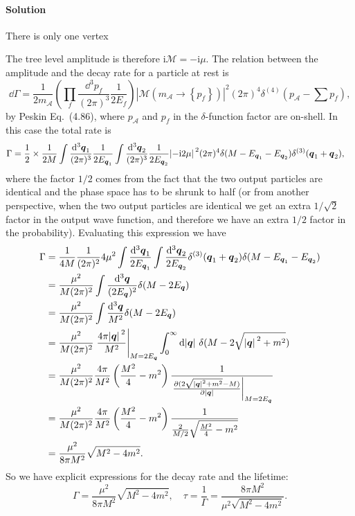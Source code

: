 \documentclass[hyperref, a4paper]{article}
\newcommand*{\ii}{\mathrm{i}}
\begin{document}
\paragraph{Solution} There is only one vertex 

The tree level amplitude is therefore $\ii \mathcal{M} = - \ii \mu$.
The relation between the amplitude and the decay rate for a particle at rest is 
\begin{equation}
    \dd \Gamma=\frac{1}{2 m_{\mathcal{A}}}\left(\prod_{f} \frac{\dd^{3} p_{f}}{(2 \pi)^{3}} \frac{1}{2 E_{f}}\right)\left|\mathcal{M}\left(m_{\mathcal{A}} \rightarrow\left\{p_{f}\right\}\right)\right|^{2}(2 \pi)^{4} \delta^{(4)}\left(p_{\mathcal{A}}-\sum p_{f}\right),
\end{equation}
by Peskin Eq.~(4.86), where $p_\mathcal{A}$ and $p_f$ in the $\delta$-function factor are on-shell.
In this case the total rate is 
\[
    \begin{aligned}
        {\Gamma} &= \frac{1}{2} \times \frac{1}{2M} \int \frac{\dd[3]{\vb*{q}_1}}{(2\pi)^3} \frac{1}{2 E_{\vb*{q}_1}} \int \frac{\dd[3]{\vb*{q}_2}}{(2\pi)^3} \frac{1}{2 E_{\vb*{q}_2}} \abs*{-\ii 2 \mu}^2 (2\pi)^4 \delta(M - E_{\vb*{q}_1} - E_{\vb*{q}_2}) \delta^{(3)}(\vb*{q}_1 + \vb*{q}_2),
    \end{aligned}
\]
where the factor $1/2$ comes from the fact that the two output particles are identical and the phase space has to be shrunk to half 
(or from another perspective, when the two output particles are identical we get an extra $1 / \sqrt{2}$ factor
in the output wave function, and therefore we have an extra $1/2$ factor in the probability).
Evaluating this expression we have 
\[
    \begin{aligned}
        \Gamma &= \frac{1}{4M} \frac{1}{(2\pi)^2} 4 \mu^2 \int \frac{\dd[3]{\vb*{q}_1}}{2 E_{\vb*{q}_1}} \int \frac{\dd[3]{\vb*{q}_2}}{2 E_{\vb*{q}_2}} \delta^{(3)}(\vb*{q}_1 + \vb*{q}_2) \delta(M - E_{\vb*{q}_1} - E_{\vb*{q}_2}) \\
        &= \frac{\mu^2}{M (2\pi)^2} \int \frac{\dd[3]{\vb*{q}}}{(2 E_{\vb*{q}})^2} \delta(M - 2 E_{\vb*{q}}) \\
        &= \frac{\mu^2}{M (2\pi)^2} \int \frac{\dd[3]{\vb*{q}}}{M^2} \delta(M - 2 E_{\vb*{q}}) \\
        &= \frac{\mu^2}{M (2\pi)^2} \eval{\frac{4 \pi \abs*{\vb*{q}}^2}{M^2}}_{M = 2 E_{\vb*{q}}} \int_0^\infty \dd{\abs*{\vb*{q}}} \delta(M - 2 \sqrt{\abs*{\vb*{q}}^2 + m^2}) \\
        &= \frac{\mu^2}{M (2\pi)^2} \frac{4\pi}{M^2} \left( \frac{M^2}{4} - m^2 \right) \frac{1}{\eval{\pdv{(2 \sqrt{\abs*{\vb*{q}}^2 + m^2} - M)}{\abs*{\vb*{q}}}}_{M = 2 E_{\vb*{q}}} } \\
        &= \frac{\mu^2}{M (2\pi)^2} \frac{4\pi}{M^2} \left( \frac{M^2}{4} - m^2 \right) \frac{1}{ \frac{2}{M/2} \sqrt{\frac{M^2}{4} - m^2} } \\
        &= \frac{\mu^2}{8 \pi M^2} \sqrt{M^2 - 4m^2}.
    \end{aligned}
\]
So we have explicit expressions for the decay rate and the lifetime:
\begin{equation}
    \Gamma = \frac{\mu^2}{8 \pi M^2} \sqrt{M^2 - 4m^2}, \quad \tau = \frac{1}{\Gamma} = \frac{8 \pi M^2}{\mu^2 \sqrt{M^2 - 4 m^2}}.
\end{equation}

\paragraph{}


 
\end{document}
